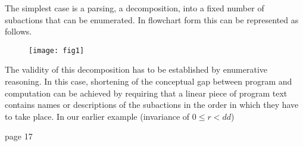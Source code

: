 The simplest case is a parsing, a decomposition, into a fixed number of subactions that can be enumerated. In flowchart form this can be represented as follows. 

\begin{figure}[h]
	\centering
	\texttt{[image: fig1]}
\end{figure}

The validity of this decomposition has to be established by enumerative reasoning. In this case, shortening of the conceptual gap between program and computation can be achieved by requiring that a linear piece of program text contains names or descriptions of the subactions in the order in which they have to take place. In our earlier example (invariance of $0 \leqslant r < dd$)

page 17